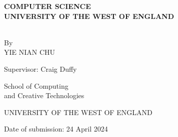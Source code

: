 \documentclass[12pt]{report}
\author{Yie Nian Chu}
\numberwithin{figure}{chapter}
\begin{document}
\begin{titlepage}
\begin{center}
    
    \vspace{2.3cm}
    
    {}

    \vspace{1cm}
    {\textbf{COMPUTER SCIENCE\\}}
    \vspace{0.3cm}
    {\textbf{UNIVERSITY OF THE WEST OF ENGLAND\\}}
    \vspace{2.4cm}
    
    {}\\
    By\\
    YIE NIAN CHU\\
    \vspace{0.9cm}
    {\begin{singlespace}Supervisor: Craig Duffy\\\end{singlespace}}
\end{center}
{\raggedleft\vfill{\begin{singlespace}
     School of Computing \\and Creative Technologies\\
\end{singlespace}
 UNIVERSITY OF THE WEST OF ENGLAND\\
 \begin{singlespace}
 Date of submission: 24 April 2024\\
 \end{singlespace}
}\par
}
\end{titlepage}
\end{document}
